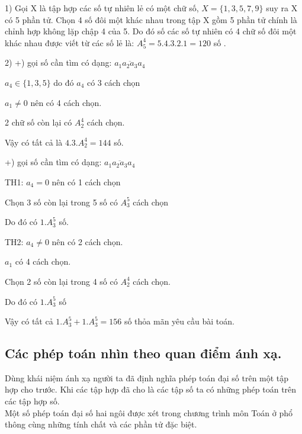 \documentclass[12pt,oneside,a4paper,reqno]{book}
\begin{document}
1) Gọi X là tập hợp các số tự nhiên lẻ có một chữ số, $X=\{1,3,5,7,9\}$ suy ra X có 5 phần tử. Chọn 4 số đôi một khác nhau trong tập X gồm 5 phần tử chính là chỉnh hợp không lặp chập 4 của 5. Do đó số các số tự nhiên có 4 chữ số đôi một khác nhau được viết từ các số lẻ là: $A_5^4=5.4.3.2.1=120$ số .

2) +) gọi số cần tìm có dạng: $\overline{a_1a_2a_3a_4} $

 $a_4  \in \{1,3,5\}$  do đó $a_4$  có 3 cách chọn

$ a_1\neq 0$ nên có 4 cách chọn.

2 chữ số còn lại có $A_2^4$  cách chọn.

Vậy có tất cả là $4.3.A_2^4=144$ số.

+) gọi số cần tìm có dạng: $\overline{a_1a_2a_3a_4}$

TH1: $a_4=0$ nên có 1 cách chọn

         Chọn 3 số còn lại trong 5 số có $A_3^5$  cách chọn

         Do đó có $1.A_3^5$  số.

TH2: $a_4\neq 0$ nên có 2 cách chọn.

          $a_1$  có 4 cách chọn.

Chọn 2 số còn lại trong 4 số có $A_2^4$  cách chọn.

Do đó có $1.A_3^5$  số

Vậy  có tất cả $1.A_3^5+1.A_3^5=156$ số thỏa mãn yêu cầu bài toán.


\subsection{Các phép toán nhìn theo quan điểm ánh xạ.}
    Dùng khái niệm ánh xạ người ta đã định nghĩa phép toán đại số trên một tập hợp cho trước. Khi các tập hợp đã cho là các tập số ta có những phép toán trên các tập hợp số.\\
    Một số phép toán đại số hai ngôi được xét trong chương trình môn Toán ở phổ thông cùng những tính chất và các phần tử đặc biệt.\\
\end{document}
